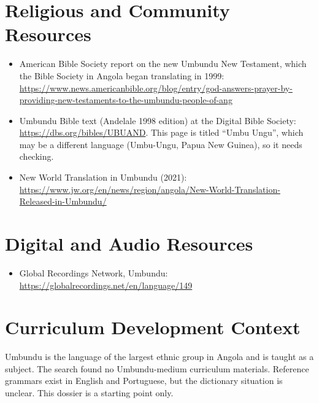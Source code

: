 \documentclass[12pt]{article}
\begin{document}
\section{Religious and Community Resources}
\begin{itemize}
\item American Bible Society report on the new Umbundu New Testament, which the Bible Society in Angola began translating in 1999: \url{https://www.news.americanbible.org/blog/entry/god-answers-prayer-by-providing-new-testaments-to-the-umbundu-people-of-ang}
\item Umbundu Bible text (Andelale 1998 edition) at the Digital Bible Society: \url{https://dbs.org/bibles/UBUAND}. This page is titled ``Umbu Ungu'', which may be a different language (Umbu-Ungu, Papua New Guinea), so it needs checking.
\item New World Translation in Umbundu (2021): \url{https://www.jw.org/en/news/region/angola/New-World-Translation-Released-in-Umbundu/}
\end{itemize}

\section{Digital and Audio Resources}
\begin{itemize}
\item Global Recordings Network, Umbundu: \url{https://globalrecordings.net/en/language/149}
\end{itemize}

\section{Curriculum Development Context}
Umbundu is the language of the largest ethnic group in Angola and is taught as a subject. The search found no Umbundu-medium curriculum materials. Reference grammars exist in English and Portuguese, but the dictionary situation is unclear. This dossier is a starting point only.
\end{document}
